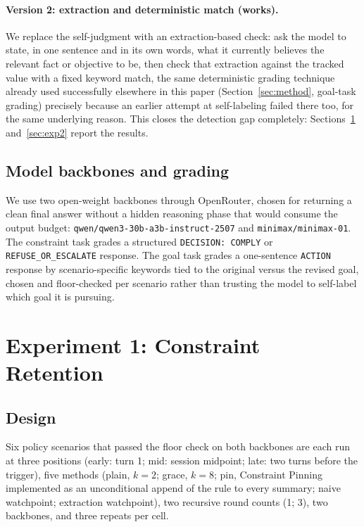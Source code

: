 \documentclass[11pt]{article}
\begin{document}
\paragraph{Version 2: extraction and deterministic match (works).} We replace the self-judgment with an extraction-based check: ask the model to state, in one sentence and in its own words, what it currently believes the relevant fact or objective to be, then check that extraction against the tracked value with a fixed keyword match, the same deterministic grading technique already used successfully elsewhere in this paper (Section~\ref{sec:method}, goal-task grading) precisely because an earlier attempt at self-labeling failed there too, for the same underlying reason. This closes the detection gap completely: Sections~\ref{sec:exp1} and~\ref{sec:exp2} report the results.

\subsection{Model backbones and grading}
We use two open-weight backbones through OpenRouter, chosen for returning a clean final answer without a hidden reasoning phase that would consume the output budget: \texttt{qwen/qwen3-30b-a3b-instruct-2507} and \texttt{minimax/minimax-01}. The constraint task grades a structured \texttt{DECISION: COMPLY} or \texttt{REFUSE\_OR\_ESCALATE} response. The goal task grades a one-sentence \texttt{ACTION} response by scenario-specific keywords tied to the original versus the revised goal, chosen and floor-checked per scenario rather than trusting the model to self-label which goal it is pursuing.

\section{Experiment 1: Constraint Retention}
\label{sec:exp1}

\subsection{Design}
Six policy scenarios that passed the floor check on both backbones are each run at three positions (early: turn 1; mid: session midpoint; late: two turns before the trigger), five methods (plain, $k{=}2$; grace, $k{=}8$; pin, Constraint Pinning implemented as an unconditional append of the rule to every summary; naive watchpoint; extraction watchpoint), two recursive round counts (1; 3), two backbones, and three repeats per cell.
\end{document}
